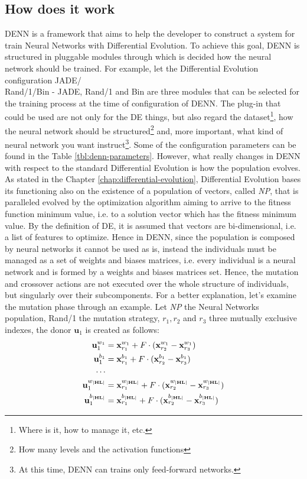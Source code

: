 \subsection{How does it work}
DENN is a framework that aims to help the developer to construct a system for train Neural Networks with Differential Evolution. To achieve this goal, DENN is structured in pluggable modules through which is decided how the neural network should be trained. For example, let the Differential Evolution configuration JADE/\\Rand/1/Bin - JADE, Rand/1 and Bin are three modules that can be selected for the training process at the time of configuration of DENN. The plug-in that could be used are not only for the DE things, but also regard the dataset\footnote{Where is it, how to manage it, etc.}, how the neural network should be structured\footnote{How many levels and the activation functions} and, more important, what kind of neural network you want instruct\footnote{At this time, DENN can trains only feed-forward networks.}. Some of the configuration parameters can be found in the Table \ref{tbl:denn-parameters}.\newline\newline
However, what really changes in DENN with respect to the standard Differential Evolution is how the population evolves. As stated in the Chapter \ref{chap:differential-evolution}, Differential Evolution bases its functioning also on the existence of a population of vectors, called \textit{NP}, that is paralleled evolved by the optimization algorithm aiming to arrive to the fitness function minimum value, i.e. to a solution vector which has the fitness minimum value. By the definition of DE, it is assumed that vectors are bi-dimensional, i.e. a list of features to optimize. Hence in DENN, since the population is composed by neural networks it cannot be used as is, instead the individuals must be managed as a set of weights and biases matrices, i.e. every individual is a neural network and is formed by a weights and biases matrices set. Hence, the mutation and crossover actions are not executed over the whole structure of individuals, but singularly over their subcomponents.\newline\newline
For a better explanation, let's examine the mutation phase through an example. Let \textit{NP} the Neural Networks population, Rand/1 the mutation strategy, $r_1, r_2$ and $r_3$ three mutually exclusive indexes, the donor $\textbf{u}_{1}$ is created as follows:
\begin{align}
	\textbf{u}_{1}^{w_1} &= \textbf{x}_{r_1}^{w_1} + F \cdot (\textbf{x}_{r_2}^{w_1} - \textbf{x}_{r_3}^{w_1}) \\
	\textbf{u}_{1}^{b_1} &= \textbf{x}_{r_1}^{b_1} + F \cdot (\textbf{x}_{r_2}^{b_1} - \textbf{x}_{r_3}^{b_1}) \\
	\cdots \cr
	\textbf{u}_{1}^{w_{|\textbf{HL}|}} &= \textbf{x}_{r_1}^{w_{|\textbf{HL}|}} + F \cdot (\textbf{x}_{r_2}^{w_{|\textbf{HL}|}} - \textbf{x}_{r_3}^{w_{|\textbf{HL}|}}) \\
	\textbf{u}_{1}^{b_{|\textbf{HL}|}} &= \textbf{x}_{r_1}^{b_{|\textbf{HL}|}} + F \cdot (\textbf{x}_{r_2}^{b_{|\textbf{HL}|}} - \textbf{x}_{r_3}^{b_{|\textbf{HL}|}})
\end{align}
